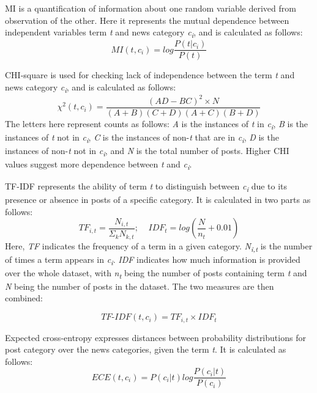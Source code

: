 \documentclass [11pt, proquest] {uwthesis}[2020/02/24]
\begin{document}
MI is a quantification of information about one random variable derived from observation of the other. Here it represents the mutual dependence between independent variables term \textit{t} and news category \textit{c\textsubscript{i}}, and is calculated as follows:
\begin{equation}
MI(t,c_{i})=log\frac{P(t|c_{i})}{P(t)}
\end{equation}

CHI-square is used for checking lack of independence between the term \textit{t} and news category \textit{c\textsubscript{i}}, and is calculated as follows:
\begin{equation}
\chi^{2}(t,c_{i})=\frac{(AD-BC)^2 \times N}{(A+B)(C+D)(A+C)(B+D)}
\end{equation}
The letters here represent counts as follows: \textit{A}  is the instances of \textit{t} in \textit{c\textsubscript{i}}, \textit{B} is the instances of \textit{t} not in \textit{c\textsubscript{i}}, \textit{C} is the instances of non-\textit{t} that are in \textit{c\textsubscript{i}}, \textit{D} is the instances of non-\textit{t} not in \textit{c\textsubscript{i}}, and \textit{N} is the total number of posts. Higher CHI values suggest more dependence between \textit{t} and \textit{c\textsubscript{i}}.

TF-IDF represents the ability of term \textit{t} to distinguish between \textit{c\textsubscript{i}} due to its presence or absence in posts of a specific category. It is calculated in two parts as follows:
\begin{equation}
TF_{i,t}=\frac{N_{i,t}}{\Sigma_{k}N_{k,t}};\;\;\;\; IDF_{t}=log\left(\frac{N}{n_{t}} + 0.01\right)
\end{equation}
Here, \textit{TF} indicates the frequency of a term in a given category. \textit{N\textsubscript{i,t}} is the number of times a term appears in \textit{c\textsubscript{i}}. \textit{IDF} indicates how much information is provided over the whole dataset, with \textit{n\textsubscript{t}} being the number of posts containing term \textit{t} and \textit{N} being the number of posts in the dataset. The two measures are then combined:

\begin{equation}
TF\mbox{-}IDF(t, c_{i}) = TF_{i,t} \times IDF_{t}
\end{equation}

Expected cross-entropy expresses distances between probability distributions for post category over the news categories, given the term \textit{t}. It is calculated as follows:
\begin{equation}
ECE(t, c_{i}) = P(c_{i}|t) log \frac{P(c_{i} | t)}{P(c_{i})}
\end{equation}
\end{document}
